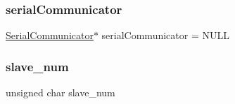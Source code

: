 \subsubsection{\texorpdfstring{serialCommunicator}{serialCommunicator}}
{\footnotesize\ttfamily \mbox{\hyperlink{class_serial_communicator}{Serial\+Communicator}}$\ast$ serial\+Communicator = N\+U\+LL}

\mbox{\label{start__module_8ino_a74d30eb4a8cad665a32a15dbee48837f}} 
\subsubsection{\texorpdfstring{slave\_num}{slave\_num}}
{\footnotesize\ttfamily unsigned char slave\+\_\+num}

